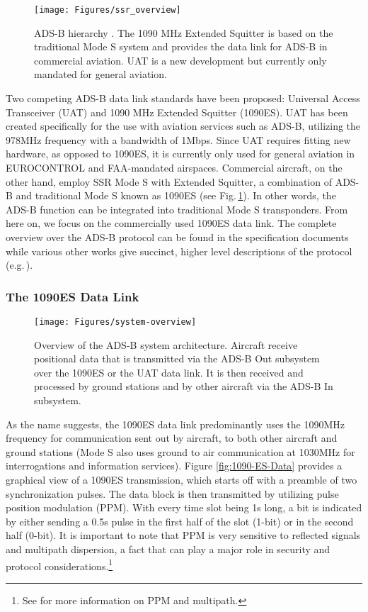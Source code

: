 \documentclass[english]{IEEEtran}
\begin{document}
\begin{figure}
\texttt{[image: Figures/ssr\_overview]}\caption{ADS-B hierarchy \cite{schafer2013experimental}.\label{fig:ADS-B-hierarchy.}
The 1090 MHz Extended Squitter is based on the traditional Mode S
system and provides the data link for ADS-B in commercial aviation.
UAT is a new development but currently only mandated for general aviation. }
\end{figure}


Two competing ADS-B data link standards have been proposed: Universal
Access Transceiver (UAT) and 1090 MHz Extended Squitter (1090ES).
UAT has been created specifically for the use with aviation services
such as ADS-B, utilizing the 978MHz frequency with a bandwidth of
1Mbps. Since UAT requires fitting new hardware, as opposed to 1090ES,
it is currently only used for general aviation\emph{ }in EUROCONTROL
and FAA-mandated airspaces. Commercial aircraft, on the other hand,
employ SSR Mode S with Extended Squitter, a combination of ADS-B and
traditional Mode S known as 1090ES (see Fig.\,\ref{fig:ADS-B-hierarchy.}).\emph{
}In other words, the ADS-B function can be integrated into traditional
Mode S transponders. From here on, we focus on the commercially used
1090ES data link. The complete overview over the ADS-B protocol can
be found in the specification documents \cite{DO2422,DO260B,DO282B2}
while various other works give succinct, higher level descriptions
of the protocol (e.g.\,\cite{Costin,schafer2013experimental,McCallie2011}). 


\subsubsection*{The 1090ES Data Link}

\begin{figure}
\texttt{[image: Figures/system-overview]}

\caption{Overview of the ADS-B system architecture. Aircraft receive positional
data that is transmitted via the ADS-B Out subsystem over the 1090ES
or the UAT data link. It is then received and processed by ground
stations and by other aircraft via the ADS-B In subsystem. \label{fig:Overview-ADS-B}}
\end{figure}


As the name suggests, the 1090ES data link predominantly uses the
1090MHz frequency for communication sent out by aircraft, to both
other aircraft and ground stations\emph{ }(Mode S also uses ground
to air communication at 1030MHz for interrogations and information
services). Figure \ref{fig:1090-ES-Data} provides a graphical view
of a 1090ES transmission, which starts off with a preamble of two
synchronization pulses. The data block is then transmitted by utilizing
pulse position modulation (PPM). With every time slot being 1\textmu{}s
long, a bit is indicated by either sending a 0.5\textmu{}s pulse in
the first half of the slot (1-bit) or in the second half (0-bit).
It is important to note that PPM is very sensitive to reflected signals
and multipath dispersion, a fact that can play a major role in security
and protocol considerations.\footnote{See \cite{barry} for more information on PPM and multipath.}
\end{document}
